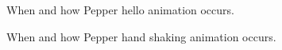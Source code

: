 \documentclass{article}
\begin{document}
\begin{figure}[H]
    \centering
    \begin{subfigure}{.5\textwidth}
      \centering
      \caption{When and how Pepper hello animation occurs.}
    \end{subfigure}%
    \begin{subfigure}{.5\textwidth}
      \centering
      \caption{When and how Pepper hand shaking animation occurs.}
    \end{subfigure} 
    \begin{subfigure}{.5\textwidth}
      \centering

\end{subfigure}
\end{figure}
\end{document}
